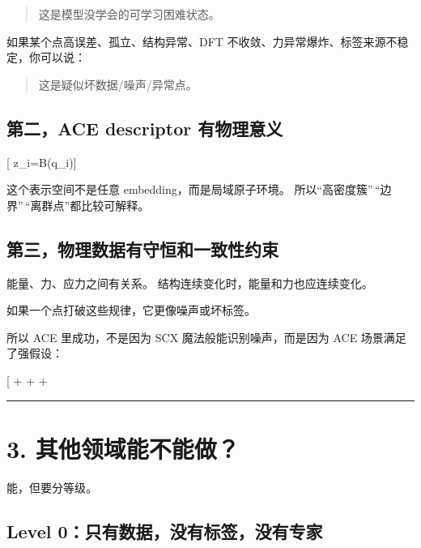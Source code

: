 \documentclass[
  12pt,
]{ctexart}
\begin{document}
\begin{quote}
这是模型没学会的可学习困难状态。
\end{quote}

如果某个点高误差、孤立、结构异常、DFT
不收敛、力异常爆炸、标签来源不稳定，你可以说：

\begin{quote}
这是疑似坏数据/噪声/异常点。
\end{quote}

\subsection{第二，ACE descriptor
有物理意义}\label{ux7b2cux4e8cace-descriptor-ux6709ux7269ux7406ux610fux4e49}

{[} z\_i=B(q\_i){]}

这个表示空间不是任意 embedding，而是局域原子环境。
所以``高密度簇''\,``边界''\,``离群点''都比较可解释。

\subsection{第三，物理数据有守恒和一致性约束}\label{ux7b2cux4e09ux7269ux7406ux6570ux636eux6709ux5b88ux6052ux548cux4e00ux81f4ux6027ux7ea6ux675f}

能量、力、应力之间有关系。 结构连续变化时，能量和力也应连续变化。

如果一个点打破这些规律，它更像噪声或坏标签。

所以 ACE 里成功，不是因为 SCX 魔法般能识别噪声，而是因为 ACE
场景满足了强假设：

{[}  +  +  +
\text{状态可解释性}{]}

\begin{center}\rule{0.5\linewidth}{0.5pt}\end{center}

\section{3.
其他领域能不能做？}\label{ux5176ux4ed6ux9886ux57dfux80fdux4e0dux80fdux505a}

能，但要分等级。

\subsection{Level
0：只有数据，没有标签，没有专家}\label{level-0ux53eaux6709ux6570ux636eux6ca1ux6709ux6807ux7b7eux6ca1ux6709ux4e13ux5bb6}
\end{document}

